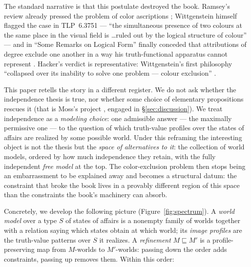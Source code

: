 \documentclass[10pt, letterpaper]{article}
\theoremstyle{remark}
\newcommand{\TLP}[1]{TLP~#1}
\begin{document}
The standard narrative is that this postulate destroyed the book. Ramsey's
review already pressed the problem of color ascriptions
\cite{ramsey1923}; Wittgenstein himself flagged the case in \TLP{6.3751} ---
``the simultaneous presence of two colours at the same place in the visual
field is \ldots ruled out by the logical structure of colour'' --- and in
``Some Remarks on Logical Form'' finally conceded that attributions of degree
exclude one another in a way his truth-functional apparatus cannot represent
\cite{wittgenstein1929}. Hacker's verdict is representative: Wittgenstein's
first philosophy ``collapsed over its inability to solve one problem ---
colour exclusion'' \cite{hacker1986}.

This paper retells the story in a different register. We do not ask whether
the independence thesis is true, nor whether some choice of elementary
propositions rescues it (that is Moss's project \cite{moss2012}, engaged in
\S\ref{sec:discussion}). We treat independence as a \emph{modeling choice}: one
admissible answer --- the maximally permissive one --- to the question of which
truth-value profiles over the states of affairs are realized by some possible
world. Under this reframing the interesting object is not the thesis but the
\emph{space of alternatives to it}: the collection of world models, ordered by
how much independence they retain, with the fully independent \emph{free
model} at the top. The color-exclusion problem then stops being an
embarrassment to be explained away and becomes a structural datum: the
constraint that broke the book lives in a provably different region of this
space than the constraints the book's machinery can absorb.

Concretely, we develop the following picture (Figure~\ref{fig:spectrum}). A
\emph{world model} over a type $S$ of states of affairs is a nonempty family
of worlds together with a relation saying which states obtain at which world;
its \emph{image profiles} are the truth-value patterns over $S$ it realizes.
A \emph{refinement} $M \sqsubseteq M'$ is a profile-preserving map from
$M$-worlds to $M'$-worlds: passing down the order adds constraints, passing up
removes them. Within this order:
\end{document}
